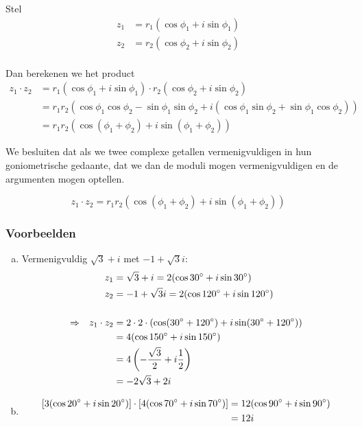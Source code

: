 \documentclass[12pt,twoside,a4paper]{article}
\begin{document}
Stel
\begin{align*}
  z_1 &= r_1 ( \cos \phi_1 + i \sin \phi_1 )\\
  z_2 &= r_2 ( \cos \phi_2 + i \sin \phi_2 )\\
\end{align*}

Dan berekenen we het product
\begin{align*}
  z_1 \cdot z_2 &= r_1 ( \cos \phi_1 + i \sin \phi_1 ) \cdot r_2 ( \cos \phi_2 + i \sin \phi_2 )\\
            &= r_1 r_2 (\cos \phi_1 \cos \phi_2 - \sin \phi_1 \sin \phi_2 + i ( \cos \phi_1 \sin \phi_2 + \sin \phi_1 \cos \phi_2))\\
            &= r_1 r_2 (\cos (\phi_1 + \phi_2) + i \sin (\phi_1 + \phi_2))
\end{align*}

We besluiten dat als we twee complexe getallen vermenigvuldigen in hun goniometrische gedaante, dat we dan de moduli mogen vermenigvuldigen en de argumenten mogen optellen.\\

\begin{mdframed}
  \[
    z_1 \cdot z_2 = r_1 r_2 \left(\cos (\phi_1 + \phi_2) + i \sin (\phi_1 + \phi_2)\right)
  \]
\end{mdframed}

\subsubsection*{Voorbeelden}

\begin{enumerate}[(a)]
\item Vermenigvuldig $\sqrt{3} + i$ met $-1+\sqrt{3}i$:
  \begin{align*}
      &&       z_1 &= \sqrt{3} + i = 2(\cos 30^\circ + i\sin 30^\circ)\\
      &&       z_2 &= -1 + \sqrt{3}i = 2(\cos 120^\circ + i\sin 120^\circ)\\\\
    \Rightarrow && z_1 \cdot z_2 &= 2 \cdot 2 \cdot ( \cos( 30^\circ + 120^\circ ) + i\sin( 30^\circ + 120^\circ ) )\\
      &&           &= 4 (\cos 150^\circ + i\sin 150^\circ)\\
      &&           &= 4 \left( -\dfrac{\sqrt{3}}{2} + i \dfrac{1}{2} \right)\\
      &&           &= -2\sqrt{3} + 2i
  \end{align*}
\item
  \begin{align*}
    \left[3(\cos 20^\circ + i\sin 20^\circ)\right] \cdot \left[4(\cos 70^\circ + i\sin 70^\circ)\right]  &= 12 (\cos 90^\circ + i\sin 90^\circ)\\
                       &= 12i
  \end{align*}
\end{enumerate}
\end{document}
